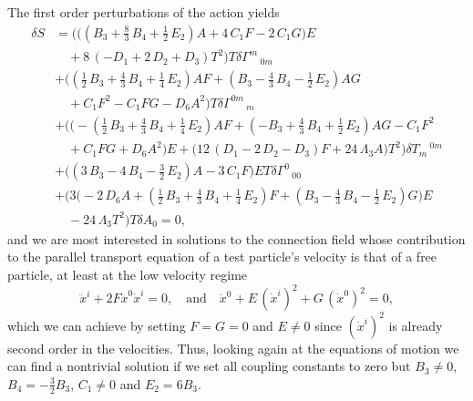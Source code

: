 \documentclass{ws-mpla}
\renewcommand{\(}{\left(}
\renewcommand{\)}{\right)}
\renewcommand{\[}{\left[}
\renewcommand{\]}{\right]}
\begin{document}
The first order perturbations of the action yields
\begin{equation}
  \label{EOM0thOrder}
  \begin{split}
    \delta S &=
    \bigg( \Big( ( B_3 + \tfrac{8}{3}\, B_4 + \tfrac{1}{2}\, E_2) A + 4\, C_1  F - 2\, C_1  G \Big) E 
    \\
    & \quad
    + 8\, ( - D_1 + 2\, D_2 + D_3) T^2 \bigg) T \delta{\Gamma}^{m}\,_{0 m}
    \\
    & + \bigg( ( \tfrac{1}{2}\, B_3 + \tfrac{4}{3}\, B_4 + \tfrac{1}{4}\, E_2) A F + ( B_3 - \tfrac{4}{3}\, B_4 - \tfrac{1}{2}\, E_2) A G 
    \\
    & \quad
    + C_1  F^2 - C_1 F G - D_6 A^2 \bigg) T \delta{\Gamma}^{0 m}\,_{m}
    \\
    & + \bigg( \Big(- (\tfrac{1}{2}\, B_3 + \tfrac{4}{3}\, B_4 + \tfrac{1}{4}\, E_2) A F + ( - B_3+ \tfrac{4}{3}\, B_4 + \tfrac{1}{2}\, E_2) A G - C_1  F^2 
    \\
    & \quad
    + C_1 F G + D_6 A^2 \Big) E + \Big( 12\, ( D_1 - 2\, D_2 - D_3) F + 24\, \Lambda_3 A \Big) T^2 \bigg)\delta{T}_{m}\,^{0 m}
    \\
    &+ \bigg( ( 3\, B_3 - 4\, B_4 - \tfrac{3}{2}\, E_2) A - 3\, C_1 F \bigg) E T \delta{\Gamma}^{0}\,_{0 0}
    \\
    &+ \bigg( 3\Big( - 2\, D_6 A + ( \tfrac{1}{2}\, B_3 + \tfrac{4}{3}\, B_4 + \tfrac{1}{4}\, E_2) F + ( B_3 - \tfrac{4}{3}\, B_4 - \tfrac{1}{2}\, E_2) G \Big) E
    \\
    & \quad - 24\, \Lambda_3 T^2 \bigg) T \delta{A}_{0}=0,
  \end{split}
\end{equation}
and we are most interested in solutions to the connection field whose contribution to the parallel transport equation of a test particle's velocity is that of a free particle, at least at the low velocity regime
\begin{equation} 
  \ddot{x}^i+2F\dot{x}^0\dot{x}^i=0, \quad \text{and} \quad \ddot{x}^0 + E \, (\dot{x}^i)^2 + G \, (\dot{x}^0)^2 = 0,
\end{equation}
which we can achieve by setting $F=G=0$ and $E \neq 0$ since $(\dot{x}^i)^2$ is already second order in the velocities. Thus, looking again at the equations of motion we can find a nontrivial solution if we set all coupling constants to zero but $B_3 \neq 0$, $B_4 = -\tfrac{3}{2} B_3$, $C_1\neq 0$ and $E_2= 6 B_3$. 
\end{document}
